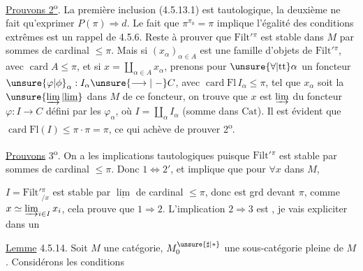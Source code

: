 \uline{Prouvons 2\textsuperscript{o}}. La première  inclusion (4.5.13.1) est tautologique, la deuxième ne fait qu'exprimer $P(\pi)\Rightarrow d$. Le fait que $\pi^{\pi_0}=\pi$ implique l'égalité des conditions extrêmes est un rappel de 4.5.6. Reste à prouver que $\mathrm{Filt}'{}^\pi$ est stable dans $M$ par sommes de cardinal $\leq\pi$. Mais
si $(x_\alpha)_{\alpha\in A}$ est une famille d'objets de $\mathrm{Filt}'{}^\pi$, avec $\operatorname{card}A\leq\pi$, et si $x=\coprod_{\alpha\in A}x_\alpha$, prenons pour $\unsure{\forall|\mathrm{tt}}\alpha$ un foncteur $\unsure{\varphi|\phi}_\alpha:I_\alpha\unsure{\longrightarrow|\mathrel{-}}C$, avec $\operatorname{card}\mathrm{Fl}\,I_\alpha\leq\pi$, tel que $x_\alpha$ soit la $\unsure{\varinjlim|\underline{\lim}}$ dans $M$ de ce foncteur, on trouve que $x$ est $\varinjlim$ du foncteur $\varphi:I\longrightarrow C$ défini par les $\varphi_\alpha$, où $I=\coprod_\alpha I_\alpha$ (somme dans $\mathrm{Cat}$). Il est évident que $\operatorname{card}\mathrm{Fl}(I)\leq\pi\cdot\pi=\pi$, ce qui achève de prouver 2\textsuperscript{o}.

\uline{Prouvons} 3\textsuperscript{o}. On a les implications tautologiques
 puisque $\mathrm{Filt}'{}^\pi$ est stable par sommes de cardinal $\leq\pi$. Donc $1\Leftrightarrow2'$, et implique que pour $\forall x$ dans $M$,

$I=\mathrm{Filt}'{}^\pi_{/x}$ est stable par $\underline{\lim}$ de cardinal $\leq\pi$, donc est grd devant $\pi$, comme $x\simeq\varinjlim_{i\in I}x_i$, cela prouve que $1\Rightarrow2$. L'implication $2\Rightarrow3$ est ,  je vais expliciter dans un

\uline{Lemme} 4.5.14. Soit $M$ une catégorie,  $M_0^{\unsure{\sharp|*}}$ une sous-catégorie  pleine de $M$. 
Considérons les conditions

